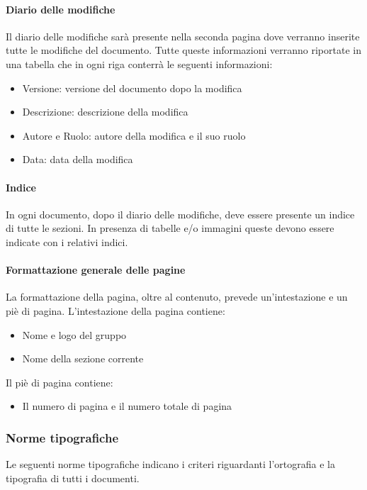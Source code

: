 \paragraph{Diario delle modifiche }

Il diario delle modifiche sarà presente nella seconda pagina dove verranno inserite tutte le modifiche del documento. Tutte queste informazioni verranno riportate in una tabella che in ogni riga conterrà le seguenti informazioni:
\begin{itemize}
\item  Versione: versione del documento dopo la modifica
\item  Descrizione: descrizione della modifica
\item  Autore e Ruolo: autore della modifica e il suo ruolo
\item  Data: data della modifica
\end{itemize}
\paragraph{Indice}

In ogni documento, dopo il diario delle modifiche, deve essere presente un indice di tutte le
sezioni. In presenza di tabelle e/o immagini queste devono essere indicate con i relativi indici.

\paragraph{Formattazione generale delle pagine}

La formattazione della pagina, oltre al contenuto, prevede un’intestazione e un piè di pagina.
L’intestazione della pagina contiene:
\begin{itemize}
\item Nome e logo del gruppo
\item Nome della sezione corrente
\end{itemize}

Il piè di pagina contiene:
\begin{itemize} 
\item Il numero di pagina e il numero totale di pagina
\end{itemize}

\subsubsection{Norme tipografiche}

Le seguenti norme tipografiche indicano i criteri riguardanti l’ortografia e la tipografia di tutti i documenti.

